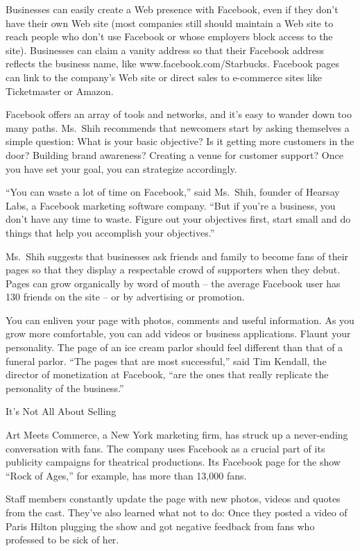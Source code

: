 ﻿\documentclass[12pt]{article}
\begin{document}
Businesses can easily create a Web presence with Facebook, even if they don't have their own Web
site (most companies still should maintain a Web site to reach people who don't use Facebook or
whose employers block access to the site). Businesses can claim a vanity address so that their
Facebook address reflects the business name, like www.facebook.com/Starbucks. Facebook pages can
link to the company's Web site or direct sales to e-commerce sites like Ticketmaster or Amazon.

Facebook offers an array of tools and networks, and it's easy to wander down too many paths.
Ms.~Shih recommends that newcomers start by asking themselves a simple question: What is your basic
objective? Is it getting more customers in the door? Building brand awareness? Creating a venue for
customer support? Once you have set your goal, you can strategize accordingly.

``You can waste a lot of time on Facebook,'' said Ms.~Shih, founder of Hearsay Labs, a Facebook
marketing software company. ``But if you're a business, you don't have any time to waste. Figure out
your objectives first, start small and do things that help you accomplish your objectives.''

Ms.~Shih suggests that businesses ask friends and family to become fans of their pages so that they
display a respectable crowd of supporters when they debut. Pages can grow organically by word of
mouth -- the average Facebook user has 130 friends on the site -- or by advertising or promotion.

You can enliven your page with photos, comments and useful information. As you grow more
comfortable, you can add videos or business applications. Flaunt your personality. The page of an
ice cream parlor should feel different than that of a funeral parlor. ``The pages that are most
successful,'' said Tim Kendall, the director of monetization at Facebook, ``are the ones that really
replicate the personality of the business.''

It's Not All About Selling

Art Meets Commerce, a New York marketing firm, has struck up a never-ending conversation with fans.
The company uses Facebook as a crucial part of its publicity campaigns for theatrical productions.
Its Facebook page for the show ``Rock of Ages,'' for example, has more than 13,000 fans.

Staff members constantly update the page with new photos, videos and quotes from the cast. They've
also learned what not to do: Once they posted a video of Paris Hilton plugging the show and got
negative feedback from fans who professed to be sick of her.
\end{document}
